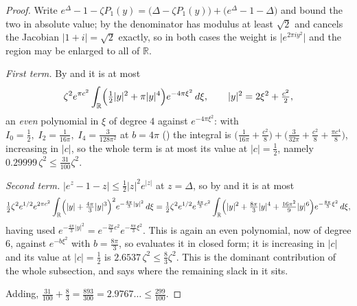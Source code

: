 \begin{proof}
\leanok
{}
Write $e^{\Delta}-1-\zeta P_{1}(y)
=\bigl(\Delta-\zeta P_{1}(y)\bigr)+\bigl(e^{\Delta}-1-\Delta\bigr)$ and bound the two in absolute
value; by  the denominator has modulus at least $\sqrt2$ and cancels the
Jacobian $\lvert1+i\rvert=\sqrt2$ exactly, so in both cases the weight is
$\lvert e^{2\pi iy^{2}}\rvert$ and the region may be enlarged to all of $\mathbb{R}$.

\emph{First term.}  By  and  it is at most
\[
  \zeta^{2}e^{\pi c^{2}}\int_{\mathbb{R}}
    \Bigl(\tfrac12\lvert y\rvert^{2}+\pi\lvert y\rvert^{4}\Bigr)e^{-4\pi\xi^{2}}\,d\xi ,
  \qquad \lvert y\rvert^{2}=2\xi^{2}+\tfrac{c^{2}}2 ,
\]
an \emph{even} polynomial in $\xi$ of degree $4$ against $e^{-4\pi\xi^{2}}$: with
$I_{0}=\tfrac12,\;I_{2}=\tfrac1{16\pi},\;I_{4}=\tfrac3{128\pi^{2}}$ at $b=4\pi$
() the integral is
$\bigl(\tfrac1{16\pi}+\tfrac{c^{2}}8\bigr)+\bigl(\tfrac3{32\pi}+\tfrac{c^{2}}8+\tfrac{\pi
c^{4}}8\bigr)$, increasing in $\lvert c\rvert$, so the whole term is at most its value at
$\lvert c\rvert=\tfrac12$, namely $0.29999\,\zeta^{2}\le\tfrac{31}{100}\zeta^{2}$.

\emph{Second term.}  $\lvert e^{z}-1-z\rvert\le\tfrac12\lvert z\rvert^{2}e^{\lvert z\rvert}$ at
$z=\Delta$, so by  and  it is at most
\[
  \tfrac12\zeta^{2}e^{1/2}e^{2\pi c^{2}}\int_{\mathbb{R}}
    \Bigl(\lvert y\rvert+\tfrac{4\pi}3\lvert y\rvert^{3}\Bigr)^{2}
    e^{-\frac{4\pi}3\lvert y\rvert^{2}}\,d\xi
  =\tfrac12\zeta^{2}e^{1/2}e^{\frac{4\pi}3c^{2}}\int_{\mathbb{R}}
    \Bigl(\lvert y\rvert^{2}+\tfrac{8\pi}3\lvert y\rvert^{4}
      +\tfrac{16\pi^{2}}9\lvert y\rvert^{6}\Bigr)e^{-\frac{8\pi}3\xi^{2}}\,d\xi ,
\]
having used $e^{-\frac{4\pi}3\lvert y\rvert^{2}}
=e^{-\frac{2\pi}3c^{2}}e^{-\frac{8\pi}3\xi^{2}}$.  This is again an even polynomial, now of
degree $6$, against $e^{-b\xi^{2}}$ with $b=\tfrac{8\pi}3$, so
 evaluates it in closed form; it is increasing in $\lvert c\rvert$
and its value at $\lvert c\rvert=\tfrac12$ is $2.6537\,\zeta^{2}\le\tfrac83\zeta^{2}$.  This is
the dominant contribution of the whole subsection, and  says where the remaining
slack in it sits.

Adding, $\tfrac{31}{100}+\tfrac83=\tfrac{893}{300}=2.9767\ldots\le\tfrac{299}{100}$.


\end{proof}
